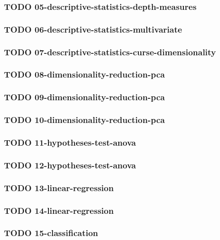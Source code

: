 \documentclass[11pt]{article}
\begin{document}
\subsubsection{{\bfseries\sffamily TODO} 05-descriptive-statistics-depth-measures}
\label{sec:org93dfd4b}
\subsubsection{{\bfseries\sffamily TODO} 06-descriptive-statistics-multivariate}
\label{sec:org963f000}
\subsubsection{{\bfseries\sffamily TODO} 07-descriptive-statistics-curse-dimensionality}
\label{sec:org6cab4b4}
\subsubsection{{\bfseries\sffamily TODO} 08-dimensionality-reduction-pca}
\label{sec:org608c85e}
\subsubsection{{\bfseries\sffamily TODO} 09-dimensionality-reduction-pca}
\label{sec:orgab5c89c}
\subsubsection{{\bfseries\sffamily TODO} 10-dimensionality-reduction-pca}
\label{sec:orgccbc758}
\subsubsection{{\bfseries\sffamily TODO} 11-hypotheses-test-anova}
\label{sec:org232d5e3}
\subsubsection{{\bfseries\sffamily TODO} 12-hypotheses-test-anova}
\label{sec:orgeb7ccce}
\subsubsection{{\bfseries\sffamily TODO} 13-linear-regression}
\label{sec:orgc352494}
\subsubsection{{\bfseries\sffamily TODO} 14-linear-regression}
\label{sec:orgabffd67}
\subsubsection{{\bfseries\sffamily TODO} 15-classification}
\label{sec:org66d39b8}
\end{document}
